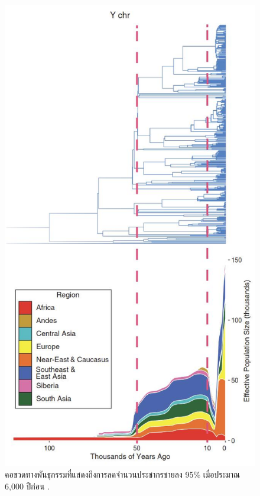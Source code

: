 \documentclass[10pt,twocolumn,letterpaper]{article}
\begin{document}
\begin{figure}[b]
\begin{center}
   \includegraphics[width=1\linewidth]{bottleneck.jpg}
\end{center}
   \caption{คอขวดทางพันธุกรรมที่แสดงถึงการลดจำนวนประชากรชายลง 95\% เมื่อประมาณ 6,000 ปีก่อน \cite{62}.}
\label{fig:10}
\label{fig:onecol}
\end{figure}
\end{document}
